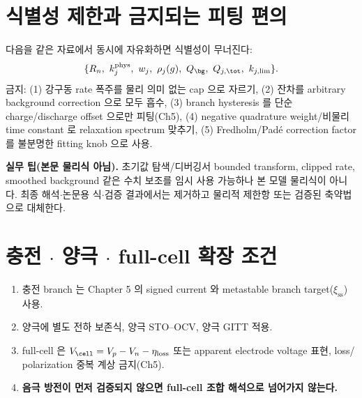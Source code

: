 \section{식별성 제한과 금지되는 피팅 편의}\label{sec:ch6_ident}
다음을 같은 자료에서 동시에 자유화하면 식별성이 무너진다:
\begin{equation}
\{R_n,\ k_j^{\mathrm{phys}},\ w_j,\ \rho_j(g),\ Q_\bg,\ Q_{j,\tot},\ k_{j,\lim}\}.
\label{eq:ch6_no_free}
\end{equation}
금지: (1) 강구동 rate 폭주를 물리 의미 없는 cap 으로 자르기, (2) 잔차를 arbitrary background correction 으로
모두 흡수, (3) branch hysteresis 를 단순 charge/discharge offset 으로만 피팅(Ch5), (4) negative quadrature
weight/비물리 time constant 로 relaxation spectrum 맞추기, (5) Fredholm/Padé correction factor 를 불분명한
fitting knob 으로 사용.
\begin{mdframed}
\textbf{실무 팁(본문 물리식 아님).} 초기값 탐색/디버깅서 bounded transform, clipped rate, smoothed background
같은 수치 보조를 임시 사용 가능하나 본 모델 물리식이 아니다. 최종 해석$\cdot$논문용 식$\cdot$검증 결과에서는
제거하고 물리적 제한항 또는 검증된 축약법으로 대체한다.
\end{mdframed}

\section{충전 $\cdot$ 양극 $\cdot$ full-cell 확장 조건}\label{sec:ch6_extension}
\begin{enumerate}[label=E\arabic*),leftmargin=2.2em]
\item 충전 branch 는 Chapter 5 의 signed current 와 metastable branch target($\xi_{\mathrm{ss}}$) 사용.
\item 양극에 별도 전하 보존식, 양극 STO--OCV, 양극 GITT 적용.
\item full-cell 은 $V_{\cell}=V_p-V_n-\eta_{\mathrm{loss}}$ 또는 apparent electrode voltage 표현, loss/
  polarization 중복 계상 금지(Ch5).
\item \textbf{음극 방전이 먼저 검증되지 않으면 full-cell 조합 해석으로 넘어가지 않는다.}
\end{enumerate}

